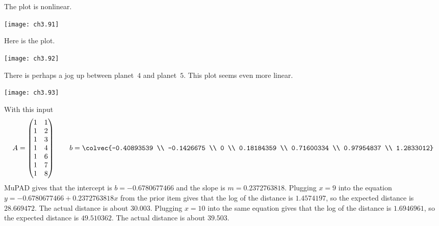 \begin{ans}{7}
        \begin{exparts}
          \partsitem The plot is nonlinear.
            \begin{center}  \small
              \texttt{[image: ch3.91]}
            \end{center}
          \partsitem Here is the plot.
           \begin{center}  \small
             \texttt{[image: ch3.92]}
           \end{center}
           There is perhaps a jog up between planet~$4$ and planet~$5$.
          \partsitem This plot seems even more linear.
           \begin{center}  \small
             \texttt{[image: ch3.93]}
           \end{center}
          \partsitem
            With this input
            \begin{equation*}
              A =
              \begin{pmatrix}
                1 & 1 \\
                1 & 2 \\
                1 & 3 \\
                1 & 4 \\
                1 & 6 \\
                1 & 7 \\
                1 & 8
              \end{pmatrix}
              \qquad
              b = \colvec{-0.40893539 \\
                          -0.1426675 \\
                           0 \\
                           0.18184359 \\
                           0.71600334 \\
                           0.97954837 \\
                           1.2833012}
            \end{equation*}
            MuPAD gives that the intercept is $b= -0.6780677466$ and
            the slope is $m=0.2372763818$.
          \partsitem Plugging $x=9$ into the equation
            $y= -0.6780677466+0.2372763818x$ from the prior item gives
            that the log of the distance is $1.4574197$, so the expected
            distance is $28.669472$.
            The actual distance is about $30.003$.
          \partsitem Plugging $x=10$ into the same equation
            gives that the log of the distance is $1.6946961$, so the expected
            distance is $49.510362$.
            The actual distance is about $39.503$.
        \end{exparts}
      
\end{ans}
